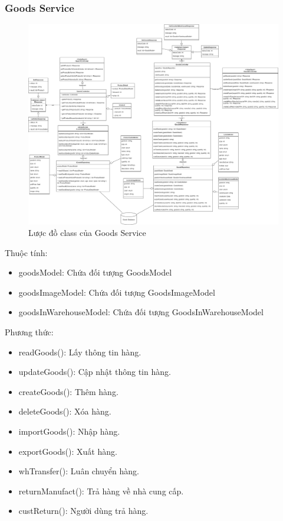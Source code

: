 \subsubsection{Goods Service}
\begin{figure}[!htp]
	\centering
	\includegraphics[width=17.5cm]{img/Architecture/service/GoodsService.png}
	\newline
	\caption{Lược đồ class của Goods Service}
\end{figure}
Thuộc tính:
\begin{itemize}
	\item goodsModel: Chứa đối tượng GoodsModel
	\item goodsImageModel: Chứa đối tượng GoodsImageModel
	\item goodsInWarehouseModel: Chứa đối tượng GoodsInWarehouseModel
\end{itemize}
Phương thức:
\begin{itemize}
	\item readGoods(): Lấy thông tin hàng.
	\item updateGoods(): Cập nhật thông tin hàng.
	\item createGoods(): Thêm hàng.
	\item deleteGoods(): Xóa hàng.
	\item importGoods(): Nhập hàng.
	\item exportGoods(): Xuất hàng.
	\item whTransfer(): Luân chuyển hàng.
	\item returnManufact(): Trả hàng về nhà cung cấp.
	\item custReturn(): Người dùng trả hàng.
\end{itemize}

